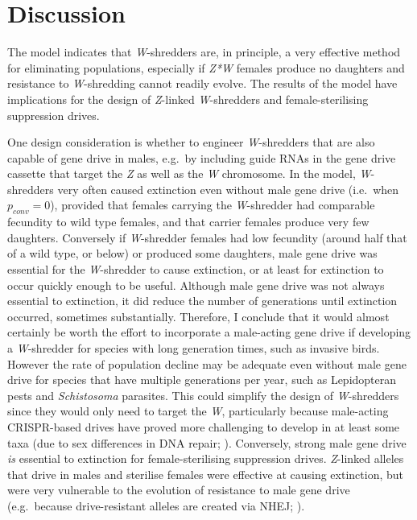 \documentclass[]{rsos}%
\begin{document}
\hypertarget{discussion}{%
\section{Discussion}\label{discussion}}

The model indicates that \emph{W}-shredders are, in principle, a very
effective method for eliminating populations, especially if \emph{Z*W}
females produce no daughters and resistance to \emph{W}-shredding cannot
readily evolve. The results of the model have implications for the
design of \emph{Z}-linked \emph{W}-shredders and female-sterilising
suppression drives.

One design consideration is whether to engineer \emph{W}-shredders that
are also capable of gene drive in males, e.g.~by including guide RNAs in
the gene drive cassette that target the \emph{Z} as well as the \emph{W}
chromosome. In the model, \emph{W}-shredders very often caused
extinction even without male gene drive (i.e.~when \(p_{conv} = 0\)),
provided that females carrying the \emph{W}-shredder had comparable
fecundity to wild type females, and that carrier females produce very
few daughters. Conversely if \emph{W}-shredder females had low fecundity
(around half that of a wild type, or below) or produced some daughters,
male gene drive was essential for the \emph{W}-shredder to cause
extinction, or at least for extinction to occur quickly enough to be
useful. Although male gene drive was not always essential to extinction,
it did reduce the number of generations until extinction occurred,
sometimes substantially. Therefore, I conclude that it would almost
certainly be worth the effort to incorporate a male-acting gene drive if
developing a \emph{W}-shredder for species with long generation times,
such as invasive birds. However the rate of population decline may be
adequate even without male gene drive for species that have multiple
generations per year, such as Lepidopteran pests and \emph{Schistosoma}
parasites. This could simplify the design of \emph{W}-shredders since
they would only need to target the \emph{W}, particularly because
male-acting CRISPR-based drives have proved more challenging to develop
in at least some taxa (due to sex differences in DNA repair;
\citep{grunwald2019super}). Conversely, strong male gene drive \emph{is}
essential to extinction for female-sterilising suppression drives.
\emph{Z}-linked alleles that drive in males and sterilise females were
effective at causing extinction, but were very vulnerable to the
evolution of resistance to male gene drive (e.g.~because drive-resistant
alleles are created via NHEJ; \citep{unckless2017ev}).
\end{document}
